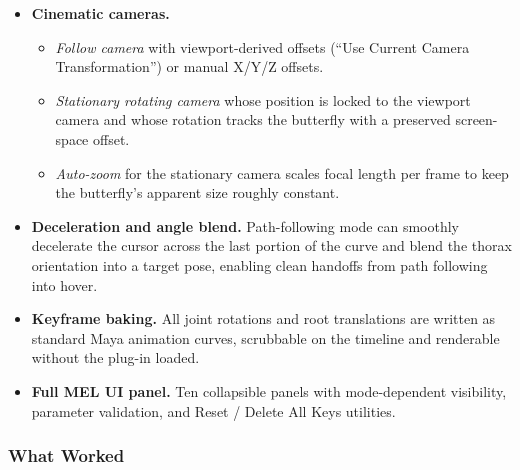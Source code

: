 \documentclass[12pt]{article}
\begin{document}
\begin{itemize}
  \item \textbf{Cinematic cameras.}
    \begin{itemize}
      \item \textit{Follow camera} with viewport-derived offsets
        (``Use Current Camera Transformation'') or manual X/Y/Z offsets.
      \item \textit{Stationary rotating camera} whose position is locked to
        the viewport camera and whose rotation tracks the butterfly with a
        preserved screen-space offset.
      \item \textit{Auto-zoom} for the stationary camera scales focal length
        per frame to keep the butterfly's apparent size roughly constant.
    \end{itemize}

  \item \textbf{Deceleration and angle blend.} Path-following mode can
    smoothly decelerate the cursor across the last portion of the curve and
    blend the thorax orientation into a target pose, enabling clean handoffs
    from path following into hover.

  \item \textbf{Keyframe baking.} All joint rotations and root translations
    are written as standard Maya animation curves, scrubbable on the timeline
    and renderable without the plug-in loaded.

  \item \textbf{Full MEL UI panel.} Ten collapsible panels with
    mode-dependent visibility, parameter validation, and Reset / Delete All
    Keys utilities.
\end{itemize}

\subsubsection{What Worked}
\end{document}
